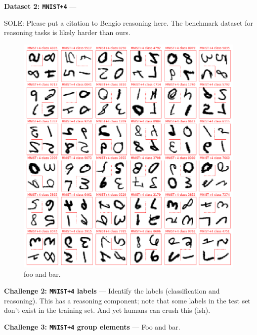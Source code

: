 \documentclass{article}
\renewcommand{\paragraph}[1]{\par\medskip\noindent\textbf{#1} ---}
\begin{document}
\paragraph{Dataset 2: \texttt{MNIST+4}}

SOLE: Please put a citation to Bengio reasoning here. 
The benchmark dataset for reasoning tasks \cite{zhang2021pointer} is likely harder than ours. 

\begin{figure}[t!]
\includegraphics[width=\textwidth]{../notebooks/MNIST+4.png}
\caption{foo and bar.\label{fig:4}}
\end{figure}

\paragraph{Challenge 2: \texttt{MNIST+4} labels}
Identify the labels (classification and reasoning).
This has a reasoning component; note that some labels in the test set don't exist in the training set.
And yet humans can crush this (ish).

\paragraph{Challenge 3: \texttt{MNIST+4} group elements}
Foo and bar.
\end{document}
